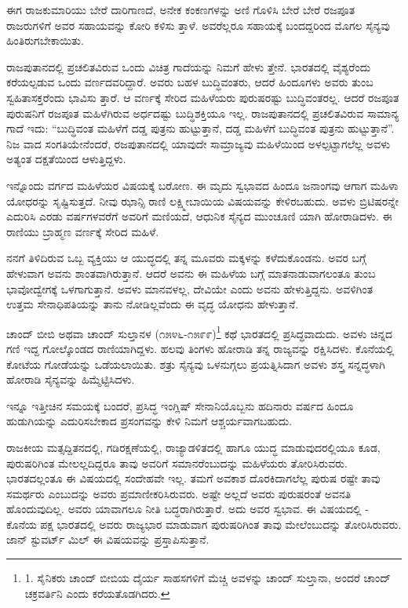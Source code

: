 ಈಗ ರಾಜಕುಮಾರಿಯು ಬೇರೆ ದಾರಿಗಾಣದೆ, ಅನೇಕ ಕಂಕಣಗಳನ್ನು ಅಣಿ ಗೊಳಿಸಿ ಬೇರೆ ಬೇರೆ ರಜಪೂತ ರಾಜರುಗಳಿಗೆ ಅವರ ಸಹಾಯವನ್ನು ಕೋರಿ ಕಳಿಸು ತ್ತಾಳೆ. ಅವರೆಲ್ಲರೂ ಸಹಾಯಕ್ಕೆ ಬಂದದ್ದರಿಂದ ಮೊಗಲ ಸೈನ್ಯವು ಹಿಂತಿರುಗಬೇಕಾಯಿತು.

ರಾಜಪುತಾನದಲ್ಲಿ ಪ್ರಚಲಿತವಿರುವ ಒಂದು ವಿಚಿತ್ರ ಗಾದೆಯನ್ನು ನಿಮಗೆ ಹೇಳು ತ್ತೇನೆ. ಭಾರತದಲ್ಲಿ ವೈಶ್ಯರೆಂದು ಕರೆಯಲ್ಪಡುವ ಒಂದು ವರ್ಣದವರಿದ್ದಾರೆ. ಅವರು ಬಹಳ ಬುದ್ಧಿವಂತರು, ಆದರೆ ಹಿಂದೂಗಳು ಅವರು ತುಂಬ ಸ್ವಹಿತಾಸಕ್ತರೆಂದು ಭಾವಿಸು ತ್ತಾರೆ. ಆ ವರ್ಣಕ್ಕೆ ಸೇರಿದ ಮಹಿಳೆಯರು ಪುರುಷರಷ್ಟು ಬುದ್ಧಿವಂತರಲ್ಲ. ಆದರೆ ರಜಪೂತ ಪುರುಷನಿಗೆ ರಜಪೂತ ಮಹಿಳೆಗಿರುವ ಅರ್ಧದಷ್ಟು ಬುದ್ಧಿಶಕ್ತಿಯೂ ಇಲ್ಲ. ರಾಜಪುತಾನದಲ್ಲಿ ಪ್ರಚಲಿತವಿರುವ ಸಾಮಾನ್ಯ ಗಾದೆ ಇದು: “ಬುದ್ಧಿವಂತ ಮಹಿಳೆಗೆ ದಡ್ಡ ಪುತ್ರನು ಹುಟ್ಟುತ್ತಾನೆ, ದಡ್ಡ ಮಹಿಳೆಗೆ ಬುದ್ಧಿವಂತ ಪುತ್ರನು ಹುಟ್ಟುತ್ತಾನೆ”. ನಿಜ ವಾದ ಸಂಗತಿಯೇನೆಂದರೆ, ರಜಪುತಾನದಲ್ಲಿ ಯಾವುದೇ ಸಾಮ್ರಾಜ್ಯವು ಮಹಿಳೆಯಿಂದ ಅಳಲ್ಪಟ್ಟಾಗಲೆಲ್ಲ ಅವಳು ಅತ್ಯಂತ ದಕ್ಷತೆಯಿಂದ ಆಳುತ್ತಿದ್ದಳು.

ಇನ್ನೊಂದು ವರ್ಗದ ಮಹಿಳೆಯರ ವಿಷಯಕ್ಕೆ ಬರೋಣ. ಈ ಮೃದು ಸ್ವಭಾವದ ಹಿಂದೂ ಜನಾಂಗವು ಆಗಾಗ ಮಹಿಳಾ ಯೋಧರನ್ನು ಸೃಷ್ಟಿಸುತ್ತದೆ. ನೀವು ಝಾನ್ಸಿ ರಾಣಿ ಲಕ್ಷ್ಮೀಬಾಯಿಯ ವಿಷಯವನ್ನು ಕೇಳಿರಬಹುದು. ಅವಳು ಬ್ರಿಟಿಷರನ್ನೇ ಎದುರಿಸಿ ಎರಡು ವರ್ಷಗಳವರೆಗೆ ಅವರಿಗೆ ಮಣಿಯದೆ, ಆಧುನಿಕ ಸೈನ್ಯದ ಮುಂಚೂಣಿ ಯಾಗಿ ಹೋರಾಡಿದಳು. ಈ ರಾಣಿಯು ಬ್ರಾಹ್ಮಣ ವರ್ಣಕ್ಕೆ ಸೇರಿದ ಮಹಿಳೆ.

ನನಗೆ ತಿಳಿದಿರುವ ಒಬ್ಬ ವ್ಯಕ್ತಿಯು ಆ ಯುದ್ಧದಲ್ಲಿ ತನ್ನ ಮೂವರು ಮಕ್ಕಳನ್ನು ಕಳೆದುಕೊಂಡನು. ಅವರ ಬಗ್ಗೆ ಹೇಳುವಾಗ ಅವನು ಶಾಂತವಾಗಿರುತ್ತಾನೆ. ಆದರೆ ಅವನು ಈ ಮಹಿಳೆಯ ಬಗ್ಗೆ ಮಾತನಾಡುವಾಗಲಂತೂ ತುಂಬ ಭಾವೋದ್ವೇಗಕ್ಕೆ ಒಳಗಾಗುತ್ತಾನೆ. ಅವಳು ಮಾನವಳಲ್ಲ, ದೇವಿಯೇ ಎಂದು ಅವನು ಹೇಳುತ್ತಿದ್ದನು. ಅವಳಿಗಿಂತ ಉತ್ತಮ ಸೇನಾಧಿಪತಿಯನ್ನು ತಾನು ನೋಡಿಲ್ಲವೆಂದು ಈ ವೃದ್ಧ ಯೋಧನು ಹೇಳುತ್ತಾನೆ.

ಚಾಂದ್ ಬೀಬಿ ಅಥವಾ ಚಾಂದ್ ಸುಲ್ತಾನಳ (೧೫೪೬-೧೫೯೯)\footnote{1. ಸೈನಿಕರು ಚಾಂದ್ ಬೀಬಿಯ ದೈರ್ಯ ಸಾಹಸಗಳಿಗೆ ಮೆಚ್ಚಿ ಅವಳನ್ನು ಚಾಂದ್ ಸುಲ್ತಾನಾ, ಅಂದರೆ ಚಾಂದ್ ಚಕ್ರವರ್ತಿನಿ ಎಂದು ಕರೆಯತೊಡಗಿದರು.} ಕಥೆ ಭಾರತದಲ್ಲಿ ಪ್ರಸಿದ್ಧವಾದುದು. ಅವಳು ಚಿನ್ನದ ಗಣಿ ಇದ್ದ ಗೋಲ್ಕೊಂಡದ ರಾಣಿಯಾಗಿದ್ದಳು. ಹಲವು ತಿಂಗಳು ಹೋರಾಡಿ ತನ್ನ ರಾಜ್ಯವನ್ನು ರಕ್ಷಿಸಿದಳು. ಕೊನೆಯಲ್ಲಿ ಕೋಟೆಯ ಗೋಡೆಯನ್ನು ಒಡೆಯಲಾಯಿತು. ಶತ್ರು ಸೈನ್ಯವು ಒಳನುಗ್ಗಲು ಪ್ರಯತ್ನಿಸಿದಾಗ ಅವಳು ಶಸ್ತ್ರ ಸನ್ನದ್ಧಳಾಗಿ ಹೋರಾಡಿ ಸೈನ್ಯವನ್ನು ಹಿಮ್ಮೆಟ್ಟಿಸಿದಳು.

ಇನ್ನೂ ಇತ್ತೀಚಿನ ಸಮಯಕ್ಕೆ ಬಂದರೆ, ಪ್ರಸಿದ್ಧ ಇಂಗ್ಲಿಷ್ ಸೇನಾನಿಯೊಬ್ಬನು ಹದಿನಾರು ವರ್ಷದ ಹಿಂದೂ ಹುಡುಗಿಯನ್ನು ಎದುರಿಸಬೇಕಾದ ಪ್ರಸಂಗವನ್ನು ಕೇಳಿ ನಿಮಗೆ ಆಶ್ಚರ್ಯವಾಗಬಹುದು.

ರಾಜಕೀಯ ಮತ್ಸದ್ದಿತನದಲ್ಲಿ, ಗಡಿರಕ್ಷಣೆಯಲ್ಲಿ, ರಾಜ್ಯಾಡಳಿತದಲ್ಲಿ ಹಾಗೂ ಯುದ್ಧ ಮಾಡುವುದರಲ್ಲಿಯೂ ಕೂಡ, ಪುರುಷರಿಗಿಂತ ಮೇಲಲ್ಲದಿದ್ದರೂ ತಾವು ಅವರಿಗೆ ಸಮಾನರೆಂಬುದನ್ನು ಮಹಿಳೆಯರು ತೋರಿಸಿರುವರು. ಭಾರತದಲ್ಲಂತೂ ಈ ವಿಷಯದಲ್ಲಿ ಸಂದೇಹವೇ ಇಲ್ಲ. ತಮಗೆ ಅವಕಾಶ ದೊರಕಿದಾಗಲೆಲ್ಲ ಪುರುಷ ರಷ್ಟೇ ತಾವು ಸಮರ್ಥರು ಎಂಬುದನ್ನು ಅವರು ಪ್ರಮಾಣೀಕರಿಸಿರುವರು. ಅಷ್ಟೇ ಅಲ್ಲದೆ ಅವರು ಪುರುಷರಂತೆ ಅವನತಿ ಹೊಂದುವುದಿಲ್ಲ. ಅವರು ಯಾವಾಗಲೂ ನೀತಿ ಬದ್ಧರಾಗಿರುತ್ತಾರೆ. ಅದು ಅವರ ಸ್ವಭಾವ. ಈ ವಿಷಯದಲ್ಲಿ - ಕೊನೆಯ ಪಕ್ಷ ಭಾರತದಲ್ಲಿ ಅವರು ರಾಜ್ಯಭಾರ ಮಾಡುವಾಗ ಪುರುಷರಿಗಿಂತ ತಾವು ಮೇಲೆಂಬುದನ್ನು ತೋರಿಸಿರುವರು. ಜಾನ್ ಸ್ಟುವರ್ಟ್ ಮಿಲ್ ಈ ವಿಷಯವನ್ನು ಪ್ರಸ್ತಾಪಿಸುತ್ತಾನೆ.


